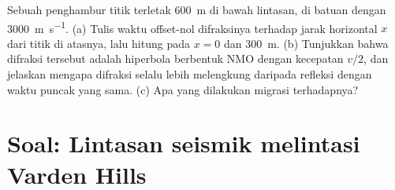 \begin{exercise}[$\star\star\star$]\label{exo:b3:exploration-seismology:12}
Sebuah penghambur titik terletak \qty{600}{m} di bawah lintasan, di batuan dengan
\qty{3000}{m.s^{-1}}. (a) Tulis waktu offset-nol difraksinya terhadap
jarak horizontal $x$ dari titik di atasnya, lalu hitung pada $x = 0$
dan \qty{300}{m}. (b) Tunjukkan bahwa difraksi tersebut adalah hiperbola berbentuk NMO
dengan kecepatan $v/2$, dan jelaskan mengapa difraksi selalu lebih melengkung daripada
refleksi dengan waktu puncak yang sama. (c) Apa yang dilakukan migrasi terhadapnya?
\end{exercise}

\section{Soal: Lintasan seismik melintasi Varden Hills}

